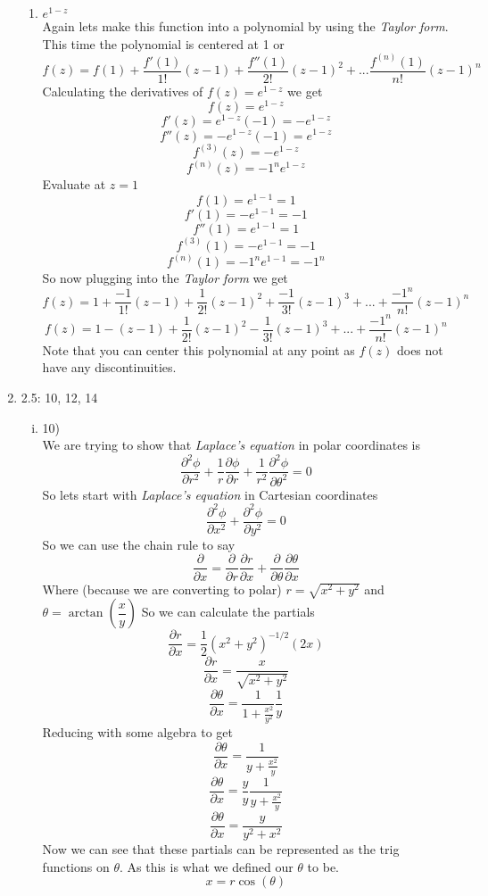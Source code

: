 \documentclass[11pt]{article}
\begin{document}
\begin{enumerate}
\begin{enumerate}
\item $e^{1-z}$\\
Again lets make this function into a polynomial by using the \emph{Taylor form}. This time the polynomial is centered at 1 or
$$f(z) = f(1) + \frac{f'(1)}{1!}(z-1) +\frac{f''(1)}{2!}(z-1)^2 + ...\frac{f^{(n)}(1)}{n!}(z-1)^n $$
Calculating the derivatives of $f(z) = e^{1-z}$ we get 
$$f(z) = e^{1-z}$$
$$f'(z) = e^{1-z}(-1) = -e^{1-z}$$
$$f''(z) = -e^{1-z}(-1)=e^{1-z}$$
$$f^{(3)}(z) = -e^{1-z}$$
$$f^{(n)}(z) = -1^{n}e^{1-z}$$
Evaluate at $z=1$
$$f(1) = e^{1-1}=1$$
$$f'(1) = -e^{1-1}=-1$$
$$f''(1) = e^{1-1}=1$$
$$f^{(3)}(1) = -e^{1-1}=-1$$
$$f^{(n)}(1) = -1^ne^{1-1}=-1^n$$
So now plugging into the \emph{Taylor form} we get
$$f(z) = 1 + \frac{-1}{1!}(z-1) +\frac{1}{2!}(z-1)^2 + \frac{-1}{3!}(z-1)^3+...+\frac{-1^n}{n!}(z-1)^n $$
$$f(z) = 1 - (z-1) + \frac{1}{2!}(z-1)^2 - \frac{1}{3!}(z-1)^3+...+\frac{-1^n}{n!}(z-1)^n $$
Note that you can center this polynomial at any point as $f(z)$ does not have any discontinuities.
\end{enumerate}
\item 2.5: 10, 12, 14
\begin{enumerate}[(i)]
\item 10)\\
We are trying to show that \emph{Laplace's equation} in polar coordinates is
$$\frac{\partial^2\phi}{\partial r^2} + \frac{1}{r}\frac{\partial\phi}{\partial r}+\frac{1}{r^2}\frac{\partial^2\phi}{\partial \theta^2}=0$$
So lets start with \emph{Laplace's equation} in Cartesian coordinates
$$\frac{\partial^2 \phi}{\partial x^2}+\frac{\partial^2 \phi}{\partial y^2}=0$$
So we can use the chain rule to say 
$$\frac{\partial}{\partial x} = \frac{\partial}{\partial r}\frac{\partial r}{\partial x} +\frac{\partial}{\partial \theta}\frac{\partial \theta}{\partial x}$$
Where (because we are converting to polar) $r = \sqrt{x^2+y^2}$ and $\theta = \arctan(\dfrac{x}{y})$
So we can calculate the partials 
$$\frac{\partial r}{\partial x} = \frac{1}{2}(x^2+y^2)^{-1/2}(2x)$$
$$\frac{\partial r}{\partial x} = \frac{x}{\sqrt{x^2+y^2}}$$
$$\frac{\partial \theta}{\partial x} = \frac{1}{1+\frac{x^2}{y^2}}\frac{1}{y}$$
Reducing with some algebra to get
$$\frac{\partial \theta}{\partial x} = \frac{1}{y+\frac{x^2}{y}}$$
$$\frac{\partial \theta}{\partial x} = \frac{y}{y}\frac{1}{y+\frac{x^2}{y}}$$
$$\frac{\partial \theta}{\partial x} = \frac{y}{y^2+x^2}$$
Now we can see that these partials can be represented as the trig functions on $\theta$. As this is what we defined our $\theta$ to be. 
$$x=r\cos(\theta)$$

\end{enumerate}
\end{enumerate}
\end{document}
